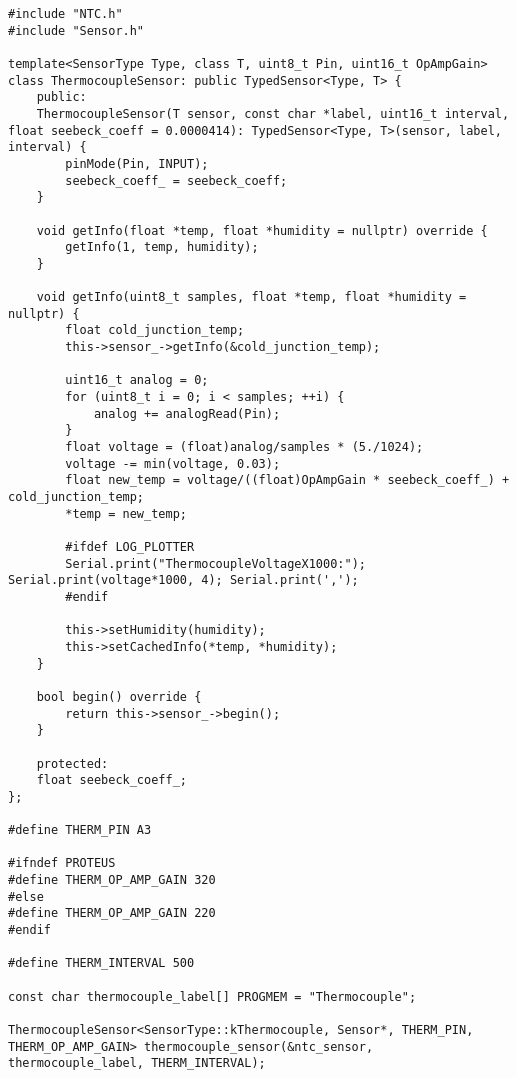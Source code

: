 \begin{lstlisting}[style=cpp-small, caption=Клас-спадок базового класу Sensor для роботи з термопарою К-типу, label=lst:tc_sensor]
#include "NTC.h"
#include "Sensor.h"

template<SensorType Type, class T, uint8_t Pin, uint16_t OpAmpGain>
class ThermocoupleSensor: public TypedSensor<Type, T> {
    public:
    ThermocoupleSensor(T sensor, const char *label, uint16_t interval, float seebeck_coeff = 0.0000414): TypedSensor<Type, T>(sensor, label, interval) {
        pinMode(Pin, INPUT);
        seebeck_coeff_ = seebeck_coeff;
    }

    void getInfo(float *temp, float *humidity = nullptr) override {
        getInfo(1, temp, humidity);
    }

    void getInfo(uint8_t samples, float *temp, float *humidity = nullptr) {
        float cold_junction_temp;
        this->sensor_->getInfo(&cold_junction_temp);

        uint16_t analog = 0;
        for (uint8_t i = 0; i < samples; ++i) {
            analog += analogRead(Pin);
        }
        float voltage = (float)analog/samples * (5./1024);
        voltage -= min(voltage, 0.03);
        float new_temp = voltage/((float)OpAmpGain * seebeck_coeff_) + cold_junction_temp;
        *temp = new_temp;

        #ifdef LOG_PLOTTER
        Serial.print("ThermocoupleVoltageX1000:"); Serial.print(voltage*1000, 4); Serial.print(',');
        #endif

        this->setHumidity(humidity);
        this->setCachedInfo(*temp, *humidity);
    }

    bool begin() override {
        return this->sensor_->begin();
    }

    protected:
    float seebeck_coeff_;
};

#define THERM_PIN A3

#ifndef PROTEUS
#define THERM_OP_AMP_GAIN 320
#else
#define THERM_OP_AMP_GAIN 220
#endif

#define THERM_INTERVAL 500

const char thermocouple_label[] PROGMEM = "Thermocouple";

ThermocoupleSensor<SensorType::kThermocouple, Sensor*, THERM_PIN, THERM_OP_AMP_GAIN> thermocouple_sensor(&ntc_sensor, thermocouple_label, THERM_INTERVAL);
\end{lstlisting}


